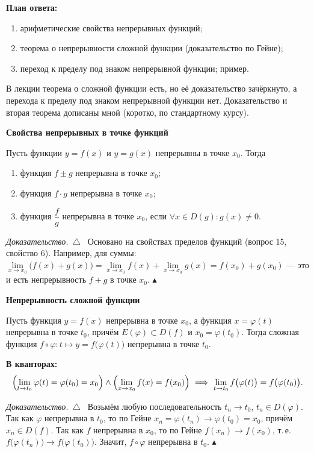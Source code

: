 \documentclass[a4paper,11pt]{article}
\newcommand{\kv}{\par\noindent\textbf{\textcolor{oprc!85!black}{В кванторах:}}}
\newenvironment{dok}
  {\par\smallskip\noindent\textit{Доказательство.}\ $\triangle$\ \ignorespaces}
  {\unskip\nobreak\hfill$\blacktriangle$\par\smallskip}
\newcommand{\podr}[1]{\par\needspace{8\baselineskip}\medskip
  {\large\bfseries\textcolor{oprc!80!black}{#1}}\par\nopagebreak\smallskip}
\newcommand{\plan}[1]{\begin{planbox}\textbf{План ответа:}
  \begin{enumerate}[nosep,leftmargin=*,label=\arabic*)]#1\end{enumerate}\end{planbox}}
\begin{document}
\plan{\item арифметические свойства непрерывных функций;
\item теорема о непрерывности сложной функции (доказательство по Гейне);
\item переход к пределу под знаком непрерывной функции; пример.}

{\small\textcolor{zamc}{В лекции теорема о сложной функции есть, но её доказательство зачёркнуто, а перехода к пределу
под знаком непрерывной функции нет. Доказательство и вторая теорема дописаны мной (коротко, по стандартному курсу).}}

\podr{Свойства непрерывных в точке функций}

\begin{teo}
Пусть функции $y = f(x)$ и $y = g(x)$ непрерывны в точке $x_0$. Тогда
\begin{enumerate}
  \item функция $f \pm g$ непрерывна в точке $x_0$;
  \item функция $f \cdot g$ непрерывна в точке $x_0$;
  \item функция $\dfrac{f}{g}$ непрерывна в точке $x_0$, если $\forall x \in D(g)\colon g(x) \ne 0$.
\end{enumerate}
\end{teo}

\begin{dok}
Основано на свойствах пределов функций (вопрос 15, свойство 6). Например, для суммы:
$\lim\limits_{x \to x_0} \bigl(f(x) + g(x)\bigr) = \lim\limits_{x \to x_0} f(x) + \lim\limits_{x \to x_0} g(x) = f(x_0) + g(x_0)$ ---
это и есть непрерывность $f + g$ в точке $x_0$.
\end{dok}

\podr{Непрерывность сложной функции}

\begin{teo}
Пусть функция $y = f(x)$ непрерывна в точке $x_0$, а функция $x = \varphi(t)$ непрерывна в точке $t_0$,
причём $E(\varphi) \subset D(f)$ и $x_0 = \varphi(t_0)$. Тогда сложная функция $f \circ \varphi\colon t \mapsto y = f\bigl(\varphi(t)\bigr)$
непрерывна в точке $t_0$.
\kv
\[
  \Bigl(\lim_{t \to t_0} \varphi(t) = \varphi(t_0) = x_0\Bigr) \wedge \Bigl(\lim_{x \to x_0} f(x) = f(x_0)\Bigr)
  \ \Longrightarrow\ \lim_{t \to t_0} f\bigl(\varphi(t)\bigr) = f\bigl(\varphi(t_0)\bigr).
\]
\end{teo}

\begin{dok}
Возьмём любую последовательность $t_n \to t_0$, $t_n \in D(\varphi)$. Так как $\varphi$ непрерывна в $t_0$, то по Гейне
$x_n = \varphi(t_n) \to \varphi(t_0) = x_0$, причём $x_n \in D(f)$. Так как $f$ непрерывна в $x_0$, то по Гейне
$f(x_n) \to f(x_0)$, т.\,е. $f\bigl(\varphi(t_n)\bigr) \to f\bigl(\varphi(t_0)\bigr)$. Значит, $f \circ \varphi$ непрерывна в $t_0$.
\end{dok}
\end{document}
